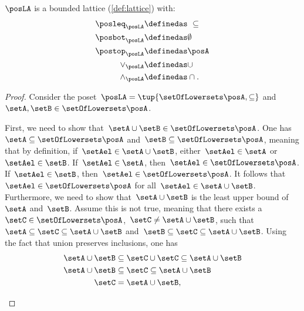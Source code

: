 \begin{lemma}
    $\posLA$ is a bounded lattice (\cref{def:lattice}) with:
    \begin{equation}
        \begin{aligned}
            \posleq_{\posLA} & \definedas \ \subseteq \\
            \posbot_{\posLA} & \definedas \emptyset   \\
            \postop_{\posLA} & \definedas \posA       \\
            \vee_{\posLA}    & \definedas \cup        \\
            \wedge_{\posLA}  & \definedas \cap.
        \end{aligned}
    \end{equation}
\end{lemma}
\begin{proof}
    Consider the poset~$\posLA=\tup{\setOfLowersets \posA,\subseteq}$ and~$\setA,\setB\in \setOfLowersets \posA$.
    \begin{compactitem}
        \item First, we need to show that~$\setA\cup \setB\in \setOfLowersets \posA$.
              One has~$\setA \subseteq \setOfLowersets \posA$ and~$\setB\subseteq \setOfLowersets \posA$, meaning that by definition, if~$\setAel\in \setA\cup \setB$, either~$\setAel\in \setA$ or~$\setAel\in \setB$.
              If~$\setAel\in \setA$, then~$\setAel\in \setOfLowersets \posA$.
              If~$\setAel\in \setB$, then~$\setAel\in \setOfLowersets \posA$.
              It follows that~$\setAel\in \setOfLowersets \posA$ for all~$\setAel\in \setA\cup \setB$.
              Furthermore, we need to show that~$\setA\cup \setB$ is the least upper bound of~$\setA$ and~$\setB$.
              Assume this is not true, meaning that there exists a~$\setC\in \setOfLowersets \posA$,~$\setC\neq \setA\cup \setB$, such that~$\setA\subseteq \setC\subseteq \setA\cup \setB$ and~$\setB\subseteq \setC\subseteq \setA\cup \setB$.
              Using the fact that union preserves inclusions, one has
              \begin{equation}
                  \begin{aligned}
                      \setA\cup \setB & \subseteq \setC\cup \setC \subseteq \setA\cup \setB \\
                      \setA\cup \setB & \subseteq \setC \subseteq \setA\cup \setB           \\
                      \setC           & = \setA\cup \setB,
                  \end{aligned}

\end{equation}
\end{compactitem}
\end{proof}
